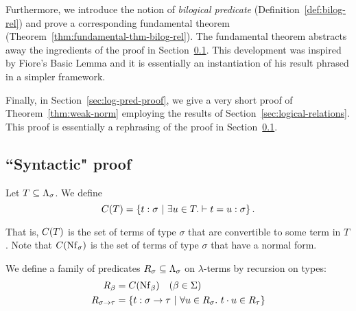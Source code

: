 Furthermore, we introduce the notion of \textit{bilogical predicate} (Definition~\ref{def:bilog-rel}) and prove a corresponding fundamental theorem (Theorem~\ref{thm:fundamental-thm-bilog-rel}). The fundamental theorem abstracts away the ingredients of the proof in Section~\ref{sec:Tait-proof}. This development was inspired by Fiore's Basic Lemma \cite{fiore:2002:ppdp, fiore:2022:mscs} and it is essentially an instantiation of his result phrased in a simpler framework.

Finally, in Section~\ref{sec:log-pred-proof}, we give a very short proof of Theorem~\ref{thm:weak-norm} employing the results of Section~\ref{sec:logical-relations}. This proof is essentially a rephrasing of the proof in Section~\ref{sec:Tait-proof}.

\subsection{``Syntactic" proof} \label{sec:Tait-proof}

\begin{defn}
Let $T \subs \Tm[\sigma]$. We define
\[ \convset{T} = \setof{\typedtm{t}{\sigma}}{\exists u \in T. \conv{t}{u}{\sigma}}. \]
\end{defn}

That is, $\convset{T}$ is the set of terms of type $\sigma$ that are convertible to some term in $T$. Note that $\convset{\Nf[\sigma]}$ is the set of terms of type $\sigma$ that have a normal form.

\begin{defn} \label{def:conv-pred}
We define a family of predicates $R_\sigma \subs \Tm[\sigma]$ on $\lambda$-terms by recursion on types:
\begin{align*}
R_\beta &= \convset{\Nf[\beta]} \quad (\beta \in \Basetypes) \\
R_{\functy{\sigma}{\tau}} &= \setof{\typedtm{t}{\functy{\sigma}{\tau}}}
    {\forall u \in R_\sigma.\ \app{t}{u} \in R_\tau}
\end{align*}
\end{defn}

